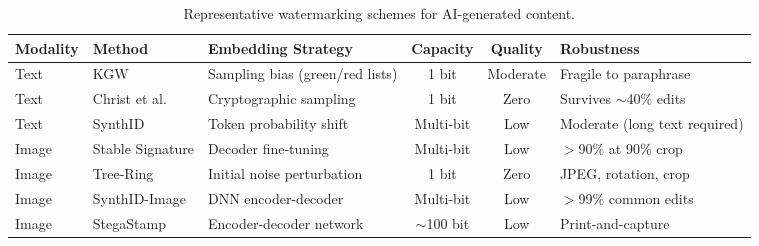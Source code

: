 
\begin{table}[htbp]
\centering
\caption{Representative watermarking schemes for AI-generated content.}
\label{tab:watermark}
\scriptsize
\setlength{\tabcolsep}{4pt}
\renewcommand{\arraystretch}{0.92}
\begin{tabularx}{\textwidth}{l l l c c X}
\toprule
\textbf{Modality} & \textbf{Method} & \textbf{Embedding Strategy} & \textbf{Capacity} & \textbf{Quality} & \textbf{Robustness} \\
\midrule
Text & KGW & Sampling bias (green/red lists) & 1 bit & Moderate & Fragile to paraphrase \\
Text & Christ et al. & Cryptographic sampling & 1 bit & Zero & Survives $\sim$40\% edits \\
Text & SynthID & Token probability shift & Multi-bit & Low & Moderate (long text required) \\
Image & Stable Signature & Decoder fine-tuning & Multi-bit & Low & $>$90\% at 90\% crop \\
Image & Tree-Ring & Initial noise perturbation & 1 bit & Zero & JPEG, rotation, crop \\
Image & SynthID-Image & DNN encoder-decoder & Multi-bit & Low & $>$99\% common edits \\
Image & StegaStamp & Encoder-decoder network & $\sim$100 bit & Low & Print-and-capture \\
\bottomrule
\end{tabularx}
\end{table}
